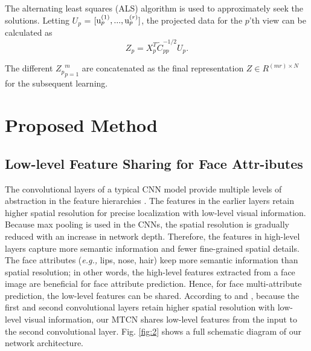 \documentclass{sig-alternate-05-2015}
\begin{document}
The alternating least squares (ALS) algorithm is used to approximately seek the solutions. Letting $U_p$ = $[{\rm u}_p^{(1)}, ..., {\rm u}_p^{(r)}]$, the projected data for the $p$'th view can be calculated as
\begin{equation}\label{}
{Z_p} = X_p^T\widetilde{C}_{pp}^{ - 1/2}{U_p}.
\end{equation}

The different ${Z_p}_{p=1}^m$ are concatenated as the final representation $Z \in {R^{(mr) \times N}}$ for the subsequent learning.
\section{Proposed Method}







\subsection{Low-level Feature Sharing for Face Attr-ibutes}

The convolutional layers of a typical CNN model provide multiple levels of abstraction in the feature hierarchies \cite{ma2015hierarchical}. The features in the earlier layers retain higher spatial resolution for precise localization with low-level visual information. Because max pooling is used in the CNNs, the spatial resolution is gradually reduced with an increase in network depth. Therefore, the features in high-level layers capture more semantic information and fewer fine-grained spatial details. The face attributes ({\em e.g.,} lips, nose, hair) keep more semantic information than spatial resolution; in other words, the high-level features extracted from a face image are beneficial for face attribute prediction. Hence, for face multi-attribute prediction, the low-level features can be shared. According to \cite{ma2015hierarchical} and \cite{hand2017attributes}, because the first and second convolutional layers retain higher spatial resolution with low-level visual information, our MTCN shares low-level features from the input to the second convolutional layer. Fig. \ref{fig:2} shows a full schematic diagram of our network architecture.
\end{document}
